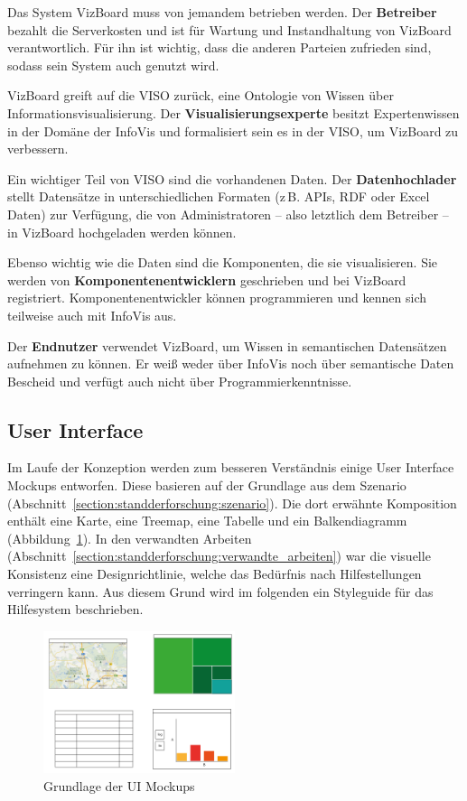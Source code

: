 \documentclass[
	headsepline,
	footsepline,
	fontsize=12pt,
	bibliography=totoc
]{scrbook}
\begin{document}
Das System VizBoard muss von jemandem betrieben werden. Der \textbf{Betreiber} bezahlt die Serverkosten und ist für Wartung und Instandhaltung von VizBoard verantwortlich. Für ihn ist wichtig, dass die anderen Parteien zufrieden sind, sodass sein System auch genutzt wird.

VizBoard greift auf die VISO zurück, eine Ontologie von Wissen über Informationsvisualisierung. Der \textbf{Visualisierungsexperte} besitzt Expertenwissen in der Domäne der InfoVis und formalisiert sein es in der VISO, um VizBoard zu verbessern.

Ein wichtiger Teil von VISO sind die vorhandenen Daten. Der \textbf{Datenhochlader} stellt Datensätze in unterschiedlichen Formaten (z\,B. APIs, RDF oder Excel Daten) zur Verfügung, die von Administratoren -- also letztlich dem Betreiber -- in VizBoard hochgeladen werden können.

Ebenso wichtig wie die Daten sind die Komponenten, die sie visualisieren. Sie werden von \textbf{Komponentenentwicklern} geschrieben und bei VizBoard registriert. Komponentenentwickler können programmieren und kennen sich teilweise auch mit InfoVis aus.

Der \textbf{Endnutzer} verwendet VizBoard, um Wissen in semantischen Datensätzen aufnehmen zu können. Er weiß weder über InfoVis noch über semantische Daten Bescheid und verfügt auch nicht über Programmierkenntnisse.

\subsection{User Interface}
\label{section:konzeption:einfuehrung:ui}

Im Laufe der Konzeption werden zum besseren Verständnis einige User Interface Mockups entworfen. Diese basieren auf der Grundlage aus dem Szenario (Abschnitt~\ref{section:standderforschung:szenario}). Die dort erwähnte Komposition enthält eine Karte, eine Treemap, eine Tabelle und ein Balkendiagramm (Abbildung~\ref{figure:ui-grundlage}). In den verwandten Arbeiten (Abschnitt~\ref{section:standderforschung:verwandte_arbeiten}) war die visuelle Konsistenz eine Designrichtlinie, welche das Bedürfnis nach Hilfestellungen verringern kann. Aus diesem Grund wird im folgenden ein Styleguide für das Hilfesystem beschrieben.

\begin{figure}[htbp]
   \centering
   \includegraphics[width=0.5\textwidth]{images/konzeption-ui-grundlage.png}
   \caption{Grundlage der UI Mockups}
   \label{figure:ui-grundlage}
\end{figure}
\end{document}

